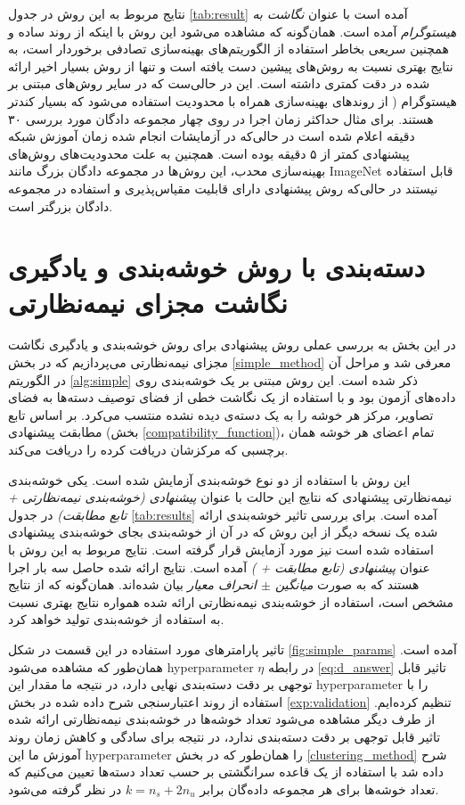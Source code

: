  نتایج مربوط به این روش در جدول \ref{tab:result} آمده است با عنوان
\textit{نگاشت به هیستوگرام}
آمده است.  همان‌گونه که مشاهده می‌شود این روش با اینکه از روند ساده و همچنین سریعی بخاطر استفاده از الگوریتم‌های بهینه‌سازی تصادفی برخوردار است، به نتایج بهتری نسبت به روش‌های پیشین دست یافته است و تنها از روش بسیار اخیر ارائه شده در \cite{agnostic} دقت کمتری داشته است. این در حالی‌ست که در سایر روش‌های مبتنی بر هیستوگرام (\cite{sse, agnostic} از روندهای بهینه‌سازی همراه با محدودیت استفاده می‌شود که بسیار کندتر هستند. برای مثال حداکثر زمان اجرا در \cite{sse} روی چهار مجموعه دادگان مورد بررسی ۳۰ دقیقه اعلام شده است در حالی‌که در آزمایشات انجام شده زمان آموزش شبکه پیشنهادی کمتر از ۵ دقیقه بوده است. همچنین به علت محدودیت‌های روش‌های بهینه‌سازی محدب، این روش‌ها در مجموعه دادگان بزرگ مانند ImageNet قابل استفاده نیستند در حالی‌که روش پیشنهادی دارای قابلیت مقیاس‌پذیری و استفاده در مجموعه دادگان بزرگتر است.
\section{دسته‌بندی با روش خوشه‌بندی و یادگیری نگاشت مجزای نیمه‌نظارتی} \label{exp:simple}
در این بخش به بررسی عملی روش پیشنهادی برای روش خوشه‌بندی و یادگیری نگاشت مجزای نیمه‌نظارتی می‌پردازیم که  در بخش \ref{simple_method} معرفی شد و مراحل آن در الگوریتم \ref{alg:simple} ذکر شده است. این روش مبتنی بر یک خوشه‌بندی روی داده‌های آزمون بود و با استفاده از یک نگاشت خطی از فضای توصیف دسته‌ها به فضای تصاویر، مرکز هر خوشه را به یک دسته‌ی دیده نشده منتسب می‌کرد. بر اساس تابع مطابقت پیشنهادی (بخش \ref{compatibility_function})، تمام اعضای هر خوشه همان برچسبی که مرکزشان دریافت کرده را دریافت می‌کند.

این روش با استفاده از دو نوع خوشه‌بندی آزمایش شده است. یکی خوشه‌بندی نیمه‌نظارتی پیشنهادی که نتایج این حالت با عنوان
\textit{پیشنهادی (خوشه‌بندی نیمه‌نظارتی + تابع مطابقت) }
در جدول \ref{tab:results} آمده است.
 برای بررسی تاثیر خوشه‌بندی ارائه شده یک نسخه دیگر از این روش که در آن از خوشه‌بندی  بجای خوشه‌بندی پیشنهادی استفاده شده است نیز مورد آزمایش قرار گرفته است. نتایج مربوط به این روش با عنوان
\textit{ پیشنهادی (تابع مطابقت +  ) }
آمده است. نتایج ارائه شده حاصل سه بار اجرا هستند که به صورت
\textit{ میانگین $\pm$ انحراف معیار }
بیان شده‌اند. همان‌گونه که از نتایج مشخص است، استفاده از خوشه‌بندی نیمه‌نظارتی ارائه شده همواره نتایج بهتری نسبت به استفاده از خوشه‌بندی   تولید خواهد کرد.

 تاثیر پارامترهای مورد استفاده در این قسمت در شکل \ref{fig:simple_params} آمده است. همان‌طور که مشاهده می‌شود \gls{hyperparameter} $\eta$ در رابطه
 \eqref{eq:d_answer}
تاثیر قابل توجهی بر دقت دسته‌بندی نهایی دارد، در نتیجه ما مقدار این \gls{hyperparameter} را با استفاده از روند اعتبارسنجی شرح داده شده در بخش \ref{exp:validation} تنظیم کرده‌ایم. از طرف دیگر مشاهده می‌شود تعداد خوشه‌ها در خوشه‌بندی نیمه‌نظارتی ارائه شده تاثیر قابل توجهی بر دقت دسته‌بندی ندارد، در نتیجه برای سادگی و کاهش زمان روند آموزش ما این \gls{hyperparameter} را همان‌طور که در بخش
 \ref{clustering_method}
 شرح داده شد با استفاده از یک قاعده سرانگشتی بر حسب تعداد دسته‌ها تعیین می‌کنیم که تعداد خوشه‌ها برای هر مجموعه داد‌ه‌گان برابر $k = n_s + 2n_u$ در نظر گرفته می‌شود.

